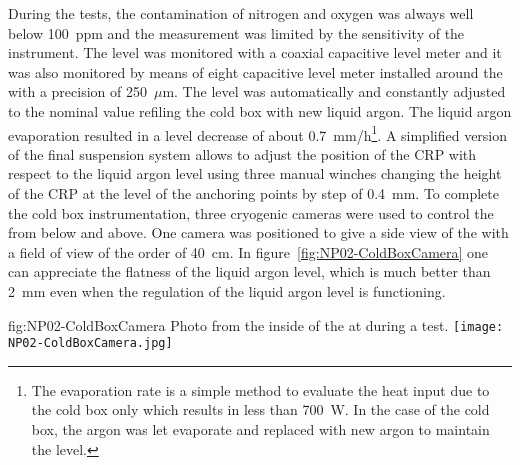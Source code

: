 During the tests, the contamination of nitrogen and oxygen was always well below 100~ppm and the measurement was limited by the sensitivity of the instrument.
The level was monitored with a coaxial capacitive level meter and it was also monitored by means of eight capacitive level meter installed around the  with a precision of 250~$\mu$m.
The level was automatically and constantly adjusted to the nominal value refiling the cold box with new liquid argon.
The liquid argon evaporation resulted in a level decrease of about 0.7~mm/h\footnote{The evaporation rate is a simple method to evaluate the heat input due to the cold box only which results in less than 700~W. In the case of the  cold box, the argon was let evaporate and replaced with new argon to maintain the level.}.
A simplified version of the  final suspension system allows to adjust the position of the CRP with respect to the liquid argon level using three manual winches changing the height of the CRP at the level of the anchoring points by step of 0.4~mm.
To complete the cold box instrumentation, three cryogenic cameras were used to control the  from below and above.
One camera was positioned to give a side view of the  with a field of view of the order of 40~cm.
In figure~\ref{fig:NP02-ColdBoxCamera} one can appreciate the flatness of the liquid argon level, which is much better than 2~mm even when the regulation of the liquid argon level is functioning.
\begin{dunefigure}{fig:NP02-ColdBoxCamera}
{Photo from the inside of the  \coldbox at  during a  test.}
\texttt{[image: NP02-ColdBoxCamera.jpg]}
\end{dunefigure}

